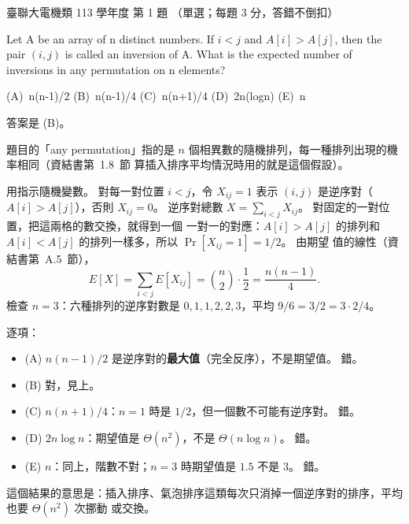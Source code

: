 \begin{pastexam}[label={px:ust-113-ee-ds-01}]{臺聯大電機類 113 學年度 第 1 題}
（單選；每題 3 分，答錯不倒扣）

Let A be an array of n distinct numbers. If $i<j$ and $A[i]>A[j]$, then the pair $(i, j)$ is called
an inversion of A. What is the expected number of inversions in any permutation on n elements?

(A)~n(n-1)/2 \qquad (B)~n(n-1)/4 \qquad (C)~n(n+1)/4 \qquad (D)~2n(logn) \qquad (E)~n
\end{pastexam}

\begin{pastsoln}
答案是 (B)。

題目的「any permutation」指的是 $n$ 個相異數的隨機排列，每一種排列出現的機率相同（資結書第~1.8~節
算插入排序平均情況時用的就是這個假設）。

用指示隨機變數。 對每一對位置 $i < j$，令 $X_{ij} = 1$ 表示 $(i, j)$ 是逆序對（$A[i] > A[j]$），否則
$X_{ij} = 0$。 逆序對總數 $X = \sum_{i<j} X_{ij}$。 對固定的一對位置，把這兩格的數交換，就得到一個
一對一的對應：$A[i] > A[j]$ 的排列和 $A[i] < A[j]$ 的排列一樣多，所以 $\Pr[X_{ij} = 1] = 1/2$。 由期望
值的線性（資結書第~A.5~節），
\[
E[X] = \sum_{i<j} E[X_{ij}] = \binom{n}{2} \cdot \frac{1}{2} = \frac{n(n-1)}{4}.
\]
檢查 $n = 3$：六種排列的逆序對數是 $0, 1, 1, 2, 2, 3$，平均 $9/6 = 3/2 = 3 \cdot 2/4$。

逐項：
\begin{itemize}
\item (A) $n(n-1)/2$ 是逆序對的\textbf{最大值}（完全反序），不是期望值。 錯。
\item (B) 對，見上。
\item (C) $n(n+1)/4$：$n = 1$ 時是 $1/2$，但一個數不可能有逆序對。 錯。
\item (D) $2n\log n$：期望值是 $\Theta(n^2)$，不是 $\Theta(n\log n)$。 錯。
\item (E) $n$：同上，階數不對；$n = 3$ 時期望值是 $1.5$ 不是 $3$。 錯。
\end{itemize}
這個結果的意思是：插入排序、氣泡排序這類每次只消掉一個逆序對的排序，平均也要 $\Theta(n^2)$ 次挪動
或交換。
\end{pastsoln}
